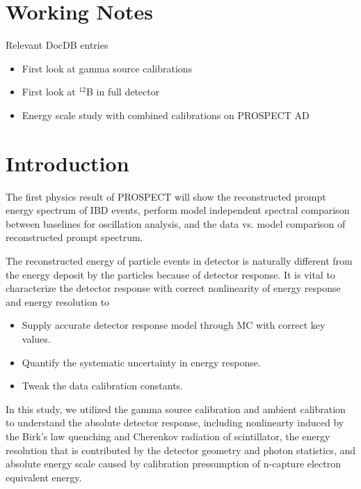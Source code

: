 




\newpage
\tableofcontents{}

\newpage
\section*{Working Notes}

Relevant DocDB entries
\begin{itemize}

\item First look at gamma source calibrations

\item First look at $^{12}$B in full detector

\item Energy scale study with combined calibrations on PROSPECT AD



\end{itemize}

\newpage

\section{Introduction}
\label{sec:intro}
The first physics result of PROSPECT will show the reconstructed prompt energy spectrum of IBD events, perform model independent spectral comparison between baselines for oscillation analysis, and the data vs. model comparison of reconstructed prompt spectrum.

The reconstructed energy of particle events in detector is naturally different from the energy deposit by the particles because of detector response. 
It is vital to characterize the detector response with correct  nonlinearity of energy response and energy resolution to
\begin{itemize}
    \item Supply accurate detector response model through MC with correct key values.
    \item Quantify the systematic uncertainty in energy response. 
    \item Tweak the data calibration constants.
\end{itemize}

In this study, we utilized the gamma source calibration and ambient calibration to understand the absolute detector response, including nonlinearty induced by the Birk's law quenching and Cherenkov radiation of scintillator, the energy resolution that is contributed by the detector geometry and photon statistics, and absolute energy scale caused by calibration pressumption of n-capture electron equivalent energy.

